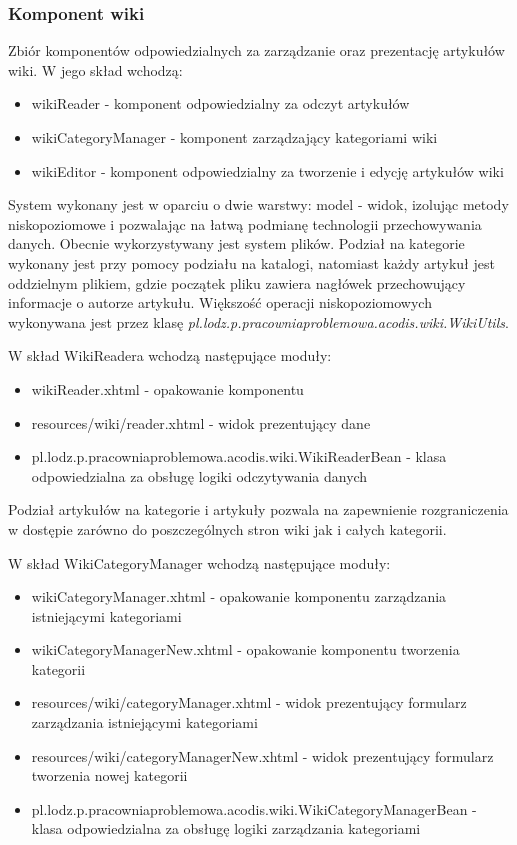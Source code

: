 \documentclass{classrep}
\begin{document}
\subsubsection{Komponent wiki}
Zbiór komponentów odpowiedzialnych za zarządzanie oraz prezentację artykułów wiki. W jego skład wchodzą:
\begin{itemize}
\item wikiReader - komponent odpowiedzialny za odczyt artykułów
\item wikiCategoryManager - komponent zarządzający kategoriami wiki
\item wikiEditor - komponent odpowiedzialny za tworzenie i edycję artykułów wiki
\end{itemize}

System wykonany jest w oparciu o dwie warstwy: model - widok, izolując metody niskopoziomowe i pozwalając na łatwą podmianę technologii przechowywania danych. Obecnie wykorzystywany jest system plików. Podział na kategorie wykonany jest przy pomocy podziału na katalogi, natomiast każdy artykuł jest oddzielnym plikiem, gdzie początek pliku zawiera nagłówek przechowujący informacje o autorze artykułu. Większość operacji niskopoziomowych wykonywana jest przez klasę \textit{pl.lodz.p.pracowniaproblemowa.acodis.wiki.WikiUtils}.

W skład WikiReadera wchodzą następujące moduły:
\begin{itemize}
\item wikiReader.xhtml - opakowanie komponentu
\item resources/wiki/reader.xhtml - widok prezentujący dane
\item pl.lodz.p.pracowniaproblemowa.acodis.wiki.WikiReaderBean - klasa odpowiedzialna za obsługę logiki odczytywania danych
\end{itemize}

Podział artykułów na kategorie i artykuły pozwala na zapewnienie rozgraniczenia w dostępie zarówno do poszczególnych stron wiki jak i całych kategorii.

W skład WikiCategoryManager wchodzą następujące moduły:
\begin{itemize}
\item wikiCategoryManager.xhtml - opakowanie komponentu zarządzania istniejącymi kategoriami
\item wikiCategoryManagerNew.xhtml - opakowanie komponentu tworzenia kategorii
\item resources/wiki/categoryManager.xhtml - widok prezentujący formularz zarządzania istniejącymi kategoriami
\item resources/wiki/categoryManagerNew.xhtml - widok prezentujący formularz tworzenia nowej kategorii
\item pl.lodz.p.pracowniaproblemowa.acodis.wiki.WikiCategoryManagerBean - klasa odpowiedzialna za obsługę logiki zarządzania kategoriami
\end{itemize}
\end{document}
